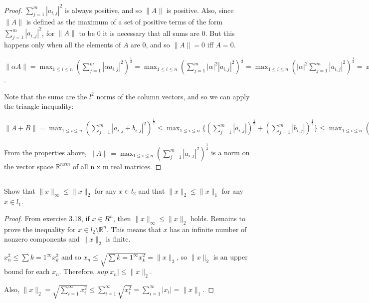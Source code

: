 \begin{proof}
$\sum_{j=1}^m |a_{i,j}|^2$ is always positive, and so $\| A \|$ is positive. Also, since $\| A \|$ is defined as the maximum of a set of positive terms of the form $\sum_{j=1}^m |a_{i,j}|^2$, for $\| A \|$ to be 0 it is necessary that all sums are 0. But this happens only when all the elements of $A$ are 0, and so $\| A \| = 0$ iff $A=0$.

$\| \alpha A \| = \max_{1 \leq i \leq n} ( \sum_{j=1}^m | \alpha a_{i,j}|^2 ) ^ {\frac{1}{2}} = \max_{1 \leq i \leq n} ( \sum_{j=1}^m |\alpha|^2 | a_{i,j}|^2 ) ^ {\frac{1}{2}} = \max_{1 \leq i \leq n} ( |\alpha|^2 \sum_{j=1}^m  | a_{i,j}|^2 ) ^ {\frac{1}{2}} = \max_{1 \leq i \leq n} |\alpha| ( \sum_{j=1}^m  | a_{i,j}|^2 ) ^ {\frac{1}{2}} = |\alpha|  \max_{1 \leq i \leq n} ( \sum_{j=1}^m  | a_{i,j}|^2 ) ^ {\frac{1}{2}} = |\alpha| \| A \|$.

Note that the sums are the $l^2$ norms of the column vectors, and so we can apply the triangle inequality:

$\| A + B \| =
\max_{1 \leq i \leq n} ( \sum_{j=1}^m |a_{i,j} + b_{i,j}|^2 ) ^ {\frac{1}{2}} \leq 
\max_{1 \leq i \leq n} \{ ( \sum_{j=1}^m |a_{i,j}| ) ^ {\frac{1}{2}} +
( \sum_{j=1}^m |b_{i,j}| ) ^ {\frac{1}{2}} \} \leq 
\max_{1 \leq i \leq n}  ( \sum_{j=1}^m |a_{i,j}| ) ^ {\frac{1}{2}} + \max_{1 \leq i \leq n}  ( \sum_{j=1}^m |b_{i,j}| ) ^ {\frac{1}{2}} =\| A \| + \| B \|
$

From the properties above, $\| A \| = \max_{1 \leq i \leq n} ( \sum_{j=1}^m |a_{i,j}|^2 ) ^ {\frac{1}{2}}$ is a norm on the vector space $\mathbb{R}^{nxm}$ of all n x m real matrices.

\end{proof}


\subsection{} Show that $\| x \|_\infty \leq \| x \|_2$ for any $x \in l_2$ and that $\| x \|_2 \leq \| x \|_1$ for any $x \in l_1$. 


\begin{proof}
From exercise 3.18, if $x \in R^n$, then $\| x \|_\infty \leq \| x \|_2$ holds. Remains to prove the inequality for $x \in l_2 \setminus \mathbb{R}^n$. This means that $x$ has an infinite number of nonzero components and $\| x \|_2$ is finite.

$x_n^2\leq \sum{k=1}^\infty x_k^2$ and so $x_n\leq \sqrt{\sum{k=1}^\infty x_k^2} = \|x\|_2$, so $\|x\|_2$ is an upper bound for each $x_n$. Therefore, $sup|x_n|\leq \|x\|_2$.


Also, $\|x\|_2 = \sqrt{\sum_{i=1}^\infty x_i^2} \leq \sum_{i=1}^\infty \sqrt{x_i^2} = \sum_{i=1}^\infty |x_i| = \|x\|_1$.

\end{proof}


